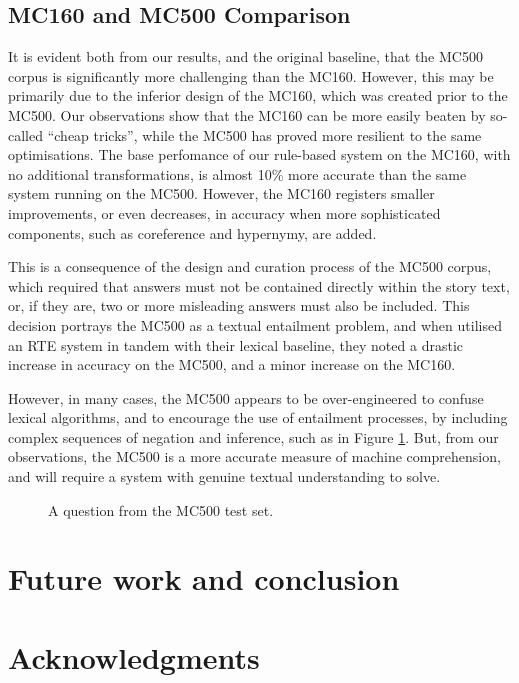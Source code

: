 \documentclass[11pt]{article}
\begin{document}
\subsection{MC160 and MC500 Comparison}

It is evident both from our results, and the original baseline, that the MC500 corpus is significantly more challenging than the MC160. However, this may be primarily due to the inferior design of the MC160, which was created prior to the MC500. Our observations show that the MC160 can be more easily beaten by so-called ``cheap tricks'', while the MC500 has proved more resilient to the same optimisations. The base perfomance of our rule-based system on the MC160, with no additional transformations, is almost 10\% more accurate than the same system running on the MC500. However, the MC160 registers smaller improvements, or even decreases, in accuracy when more sophisticated components, such as coreference and hypernymy, are added.

This is a consequence of the design and curation process of the MC500 corpus, which required that answers must not be contained directly within the story text, or, if they are, two or more misleading answers must also be included. This decision portrays the MC500 as a textual entailment problem, and when  utilised an RTE system in tandem with their lexical baseline, they noted a drastic increase in accuracy on the MC500, and a minor increase on the MC160.

However, in many cases, the MC500 appears to be over-engineered to confuse lexical algorithms, and to encourage the use of entailment processes, by including complex sequences of negation and inference, such as in Figure \ref{fig:exampleMC500hard}. But, from our observations, the MC500 is a more accurate measure of machine comprehension, and will require a system with genuine textual understanding to solve.

\begin{figure}[!th]

\caption{\label{fig:exampleMC500hard} A question from the MC500 test set.}
\end{figure}

\section{Future work and conclusion}


\section*{Acknowledgments}




\end{document}
